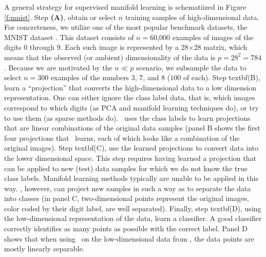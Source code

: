 \documentclass[10pt]{article}
\begin{document}
A general strategy for supervised manifold learning is schematiized in Figure \ref{f:mnist}.
Step \textbf{(A)},  obtain or select $n$ training samples of high-dimensional data.  For concreteness, we utilize one of the most popular benchmark datasets, the MNIST dataset \cite{mnist}.  This dataset consists of $n=60$,$000$ examples of images of the digits 0 through 9.  Each such image is represented by a 28$\times$28 matrix, which means that the observed (or ambient) dimensionality of the data is $p=28^2=784$.  Because we are motivated by the $n \ll p$ scenario, we subsample the data to select $n=300$ examples of the numbers $3$, $7$, and $8$ ($100$ of each).
%
Step textbf{(B)},  learn a ``projection'' that converts the high-dimensional data to a low dimension representation.  One can either ignore the class label data, that is, which images correspond to which digits (as PCA and manifold learning techniques do), or try to use them (as sparse methods do).  \Lol~uses the class labels to learn projections that are linear combinations of the original data samples (panel B shows the first four projections that \Lol~learns, each of which looks like a combination of the original images).  
%
Step textbf{(C)}, use the learned projections to convert data into the lower dimensional space. This step requires having learned a projection that can be applied to new (test) data samples for which we do not know the true class labels.  Manifold learning methods typically are unable to be applied in this way.  \Lol, however, can project new samples in such a way as to separate the data into classes (in panel C, two-dimensional points represent the original images, color coded by their digit label, are well separated).
Finally, step textbf{(D)}, using the low-dimensional representation of the data, learn a classifier.  A good classifier correctly identifies as many points as possible with the correct label.  Panel D shows that when using \Lda~on the low-dimensional data from \Lol, the data points are mostly linearly separable. 

\end{document}
